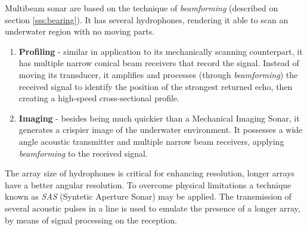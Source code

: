 Multibeam sonar are based on the technique of \textit{beamforming} (described
on section \ref{sss:bearing}). It has several hydrophones, rendering it able to
scan an underwater region with no moving parts.


\begin{enumerate}
  \item \textbf{Profiling} - similar in application to its mechanically scanning
  counterpart, it has multiple narrow conical beam receivers that record the
  signal. Instead of moving its transducer, it amplifies and processes (through
  \textit{beamforming}) the received signal to identify the position of the
  strongest returned echo, then creating a high-speed cross-sectional profile.
  \item \textbf{Imaging} - besides being much quickier than a Mechanical Imaging
  Sonar, it generates a crispier image of the underwater environment. It
  possesses a wide angle acoustic transmitter and multiple narrow beam
  receivers, applying \textit{beamforming} to the received signal.
\end{enumerate}

The array size of hydrophones is critical for enhancing resolution, longer
arrays have a better angular resolution. To overcome physical limitations a
technique known as \textit{SAS} (Syntetic Aperture Sonar) may be applied. The
transmission of several acoustic pulses in a line is used to emulate the
presence of a longer array, by means of signal processing on the reception.
